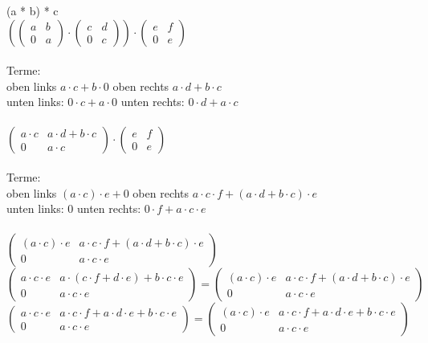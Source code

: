 \documentclass{scrartcl}
\begin{document}
\begin{enumerate}
(a * b) * c\\
$(\begin{pmatrix}
a & b \\ 0 & a
\end{pmatrix} \cdot \begin{pmatrix}
c & d \\ 0 & c
\end{pmatrix}) \cdot \begin{pmatrix}
e & f \\ 0 & e
\end{pmatrix}$\\\\
Terme:\\
oben links $a \cdot c + b \cdot 0$ \hspace{2cm}
oben rechts $a \cdot d + b \cdot c$\\
unten links: $0 \cdot c + a \cdot 0$ \hspace{2cm}
unten rechts: $ 0 \cdot d + a \cdot c$\\\\
$\begin{pmatrix}
a \cdot c & a \cdot d + b \cdot c \\ 0 & a \cdot c
\end{pmatrix}  \cdot \begin{pmatrix}
e & f \\ 0 & e
\end{pmatrix}$\\\\
Terme:\\
oben links $(a \cdot c) \cdot e + 0$ \hspace{2cm}
oben rechts $a \cdot c \cdot f + (a \cdot d + b \cdot c) \cdot e$\\
unten links: $0$ \hspace{2cm}
unten rechts: $ 0 \cdot f + a \cdot c \cdot e$\\\\
$\begin{pmatrix}
	(a \cdot c) \cdot e & a \cdot c \cdot f + (a \cdot d + b \cdot c) \cdot e \\ 0 & a \cdot c \cdot e
\end{pmatrix}$\\
$\begin{pmatrix}
a\cdot c \cdot e & a \cdot (c \cdot f + d \cdot e) + b \cdot c \cdot e \\ 0 & a \cdot c \cdot e
\end{pmatrix}=\begin{pmatrix}
(a \cdot c) \cdot e & a \cdot c \cdot f + (a \cdot d + b \cdot c) \cdot e \\ 0 & a \cdot c \cdot e
\end{pmatrix}$\\
$\begin{pmatrix}
a\cdot c \cdot e & a \cdot c \cdot f + a \cdot d \cdot e + b \cdot c \cdot e \\ 0 & a \cdot c \cdot e
\end{pmatrix}=\begin{pmatrix}
(a \cdot c) \cdot e & a \cdot c \cdot f + a \cdot d \cdot e + b \cdot c \cdot e \\ 0 & a \cdot c \cdot e
\end{pmatrix}$
\end{enumerate}
\end{document}
